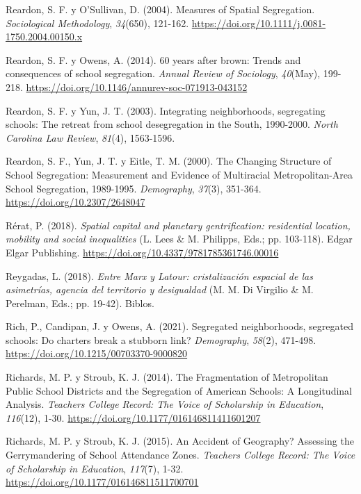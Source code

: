 \documentclass[
  spanish,
  a4paper,%
  chapterprefix=true,%
  DIV=calc,%
  twoside]{scrbook}%
\newlength{\cslhangindent}
\newenvironment{CSLReferences}[2] %
 {\begin{list}{}{%
  \setlength{\itemindent}{0pt}
  \setlength{\leftmargin}{0pt}
  \setlength{\parsep}{0pt}
  \ifodd #1
   \setlength{\leftmargin}{\cslhangindent}
   \setlength{\itemindent}{-1\cslhangindent}
  \fi
  \setlength{\itemsep}{#2\baselineskip}}}
 {\end{list}}
\begin{document}
\begin{CSLReferences}{1}{0}
Reardon, S. F. y O'Sullivan, D. (2004). Measures of Spatial Segregation. \emph{Sociological Methodology}, \emph{34}(650), 121-162. \url{https://doi.org/10.1111/j.0081-1750.2004.00150.x}

Reardon, S. F. y Owens, A. (2014). 60 years after brown: Trends and consequences of school segregation. \emph{Annual Review of Sociology}, \emph{40}(May), 199-218. \url{https://doi.org/10.1146/annurev-soc-071913-043152}

Reardon, S. F. y Yun, J. T. (2003). Integrating neighborhoods, segregating schools: The retreat from school desegregation in the South, 1990-2000. \emph{North Carolina Law Review}, \emph{81}(4), 1563-1596.

Reardon, S. F., Yun, J. T. y Eitle, T. M. (2000). The Changing Structure of School Segregation: Measurement and Evidence of Multiracial Metropolitan-Area School Segregation, 1989-1995. \emph{Demography}, \emph{37}(3), 351-364. \url{https://doi.org/10.2307/2648047}

Rérat, P. (2018). \emph{Spatial capital and planetary gentrification: residential location, mobility and social inequalities} (L. Lees \& M. Philipps, Eds.; pp. 103-118). Edgar Elgar Publishing. \url{https://doi.org/10.4337/9781785361746.00016}

Reygadas, L. (2018). \emph{Entre Marx y Latour: cristalización espacial de las asimetrías, agencia del territorio y desigualdad} (M. M. Di Virgilio \& M. Perelman, Eds.; pp. 19-42). Biblos.

Rich, P., Candipan, J. y Owens, A. (2021). Segregated neighborhoods, segregated schools: Do charters break a stubborn link? \emph{Demography}, \emph{58}(2), 471-498. \url{https://doi.org/10.1215/00703370-9000820}

Richards, M. P. y Stroub, K. J. (2014). The Fragmentation of Metropolitan Public School Districts and the Segregation of American Schools: A Longitudinal Analysis. \emph{Teachers College Record: The Voice of Scholarship in Education}, \emph{116}(12), 1-30. \url{https://doi.org/10.1177/016146811411601207}

Richards, M. P. y Stroub, K. J. (2015). An Accident of Geography? Assessing the Gerrymandering of School Attendance Zones. \emph{Teachers College Record: The Voice of Scholarship in Education}, \emph{117}(7), 1-32. \url{https://doi.org/10.1177/016146811511700701}


\end{CSLReferences}
\end{document}
